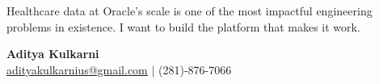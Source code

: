 \documentclass[11pt,letterpaper]{article}
\begin{document}
\vspace{8pt}

Healthcare data at Oracle's scale is one of the most impactful engineering problems in existence. I want to build the platform that makes it work.

\vspace{12pt}

{\color{OracleRed} \textbf{Aditya Kulkarni}} \\
\href{mailto:adityakulkarnius@gmail.com}{adityakulkarnius@gmail.com} \quad $|$ \quad (281)-876-7066
\end{document}
